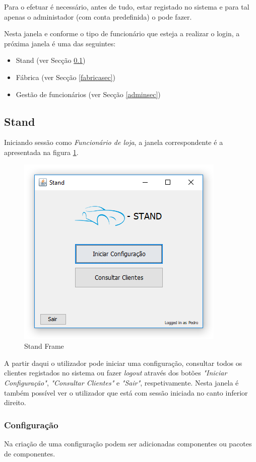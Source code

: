 \documentclass[11pt]{article} %
\begin{document}
Para o efetuar é necessário, antes de tudo, estar registado no sistema e para tal apenas o administador (com conta predefinida) o pode fazer. 

Nesta janela e conforme o tipo de funcionário que esteja a realizar o login, a próxima janela é uma das seguintes:
\begin{itemize}
	\item Stand (ver Secção \ref{standsec})
	\item Fábrica (ver Secção \ref{fabricasec})
	\item Gestão de funcionários (ver Secção \ref{adminsec})
\end{itemize}

\subsection{Stand}
\label{standsec}

Iniciando sessão como \textit{Funcionário de loja}, a janela correspondente é a apresentada na figura \ref{standframe}.
\begin{figure}[H]
	\centering
	\includegraphics[]{standframe.png}
	\caption{Stand Frame}
	\label{standframe}
\end{figure}

A partir daqui o utilizador pode iniciar uma configuração, consultar todos os clientes registados no sistema ou fazer \textit{logout} através dos botões \textit{"Iniciar Configuração"}, \textit{"Consultar Clientes"} e \textit{"Sair"}, respetivamente. Nesta janela é também possível ver o utilizador que está com sessão iniciada no canto inferior direito.

\subsubsection{Configuração}
Na criação de uma configuração podem ser adicionadas componentes ou pacotes de componentes.
\end{document}
